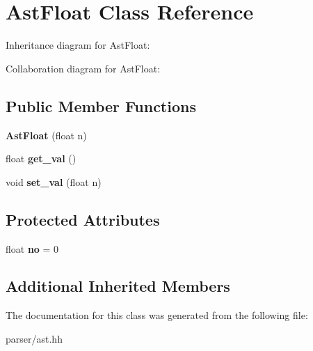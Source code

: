 \hypertarget{classAstFloat}{}\section{Ast\+Float Class Reference}
\label{classAstFloat}


Inheritance diagram for Ast\+Float\+:


Collaboration diagram for Ast\+Float\+:
\subsection*{Public Member Functions}
\begin{DoxyCompactItemize}
\item 
\mbox{\label{classAstFloat_a0c22a729167b1dde9cc3e0c1fa5e66db}} 
{\bfseries Ast\+Float} (float n)
\item 
\mbox{\label{classAstFloat_a59f514edbc8ed6ee8b0a9c2e06ef4cd4}} 
float {\bfseries get\+\_\+val} ()
\item 
\mbox{\label{classAstFloat_ab15e47a4539f35ab6411f175821f0c20}} 
void {\bfseries set\+\_\+val} (float n)
\end{DoxyCompactItemize}
\subsection*{Protected Attributes}
\begin{DoxyCompactItemize}
\item 
\mbox{\label{classAstFloat_a1ba07c1b208ace093a79d86dad72e803}} 
float {\bfseries no} = 0
\end{DoxyCompactItemize}
\subsection*{Additional Inherited Members}


The documentation for this class was generated from the following file\+:\begin{DoxyCompactItemize}
\item 
parser/ast.\+hh\end{DoxyCompactItemize}
